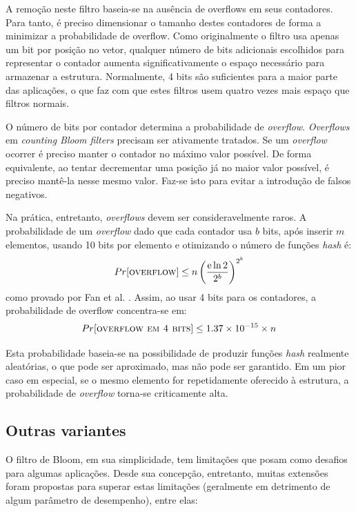 A remoção neste filtro baseia-se na ausência de overflows em seus contadores. Para tanto, é preciso dimensionar o tamanho destes contadores de forma a minimizar a probabilidade de overflow. Como originalmente o filtro usa apenas um bit por posição no vetor, qualquer número de bits adicionais escolhidos para representar o contador aumenta significativamente o espaço necessário para armazenar a estrutura. Normalmente, 4 bits são suficientes para a maior parte das aplicações, o que faz com que estes filtros usem quatro vezes mais espaço que filtros normais.

O número de bits por contador determina a probabilidade de \emph{overflow}. \emph{Overflows} em \emph{counting Bloom filters} precisam ser ativamente tratados. Se um \emph{overflow} ocorrer é preciso manter o contador no máximo valor possível. De forma equivalente, ao tentar decrementar uma posição já no maior valor possível, é preciso mantê-la nesse mesmo valor. Faz-se isto para evitar a introdução de falsos negativos.

Na prática, entretanto, \emph{overflows} devem ser consideravelmente raros. A probabilidade de um \emph{overflow} dado que cada contador usa $b$ bits, após inserir $m$ elementos, usando 10 bits por elemento e otimizando o número de funções \emph{hash} é:
\[
Pr[\textsc{overflow}] \leq n \left( \frac{\mathrm{e} \ln 2}{2^b} \right)^{2^b}
\]
como provado por Fan et al. \cite{fan1998summary}. Assim, ao usar 4 bits para os contadores, a probabilidade de overflow concentra-se em:
\[
Pr[\textsc{overflow em 4 bits}] \leq 1.37 \times 10^{-15} \times n
\]

Esta probabilidade baseia-se na possibilidade de produzir funções \emph{hash} realmente aleatórias, o que pode ser aproximado, mas não pode ser garantido. Em um pior caso em especial, se o mesmo elemento for repetidamente oferecido à estrutura, a probabilidade de \emph{overflow} torna-se criticamente alta.

\subsection{Outras variantes}\label{sec:bloom:variants}

O filtro de Bloom, em sua simplicidade, tem limitações que posam como desafios para algumas aplicações. Desde sua concepção, entretanto, muitas extensões foram propostas para superar estas limitações (geralmente em detrimento de algum parâmetro de desempenho), entre elas:

